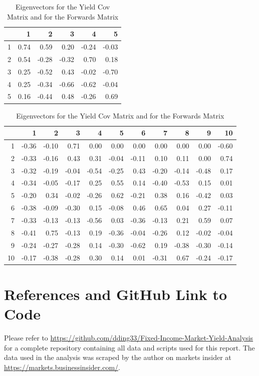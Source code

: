 \documentclass{article}
\begin{document}
\begin{enumerate}
\begin{table}[ht]
\centering
\begin{tabular}{rrrrrr}
  \hline
 & 1 & 2 & 3 & 4 & 5 \\ 
  \hline
1 & 0.74 & 0.59 & 0.20 & -0.24 & -0.03 \\ 
  2 & 0.54 & -0.28 & -0.32 & 0.70 & 0.18 \\ 
  3 & 0.25 & -0.52 & 0.43 & -0.02 & -0.70 \\ 
  4 & 0.25 & -0.34 & -0.66 & -0.62 & -0.04 \\ 
  5 & 0.16 & -0.44 & 0.48 & -0.26 & 0.69 \\ 
   \hline
\end{tabular}
\centering
\begin{tabular}{rrrrrrrrrrr}
  \hline
 & 1 & 2 & 3 & 4 & 5 & 6 & 7 & 8 & 9 & 10 \\ 
  \hline
1 & -0.36 & -0.10 & 0.71 & 0.00 & 0.00 & 0.00 & 0.00 & 0.00 & 0.00 & -0.60 \\ 
  2 & -0.33 & -0.16 & 0.43 & 0.31 & -0.04 & -0.11 & 0.10 & 0.11 & 0.00 & 0.74 \\ 
  3 & -0.32 & -0.19 & -0.04 & -0.54 & -0.25 & 0.43 & -0.20 & -0.14 & -0.48 & 0.17 \\ 
  4 & -0.34 & -0.05 & -0.17 & 0.25 & 0.55 & 0.14 & -0.40 & -0.53 & 0.15 & 0.01 \\ 
  5 & -0.20 & 0.34 & -0.02 & -0.26 & 0.62 & -0.21 & 0.38 & 0.16 & -0.42 & 0.03 \\ 
  6 & -0.38 & -0.09 & -0.30 & 0.15 & -0.08 & 0.46 & 0.65 & 0.04 & 0.27 & -0.11 \\ 
  7 & -0.33 & -0.13 & -0.13 & -0.56 & 0.03 & -0.36 & -0.13 & 0.21 & 0.59 & 0.07 \\ 
  8 & -0.41 & 0.75 & -0.13 & 0.19 & -0.36 & -0.04 & -0.26 & 0.12 & -0.02 & -0.04 \\ 
  9 & -0.24 & -0.27 & -0.28 & 0.14 & -0.30 & -0.62 & 0.19 & -0.38 & -0.30 & -0.14 \\ 
  10 & -0.17 & -0.38 & -0.28 & 0.30 & 0.14 & 0.01 & -0.31 & 0.67 & -0.24 & -0.17 \\ 
   \hline
\end{tabular}
\caption{Eigenvectors for the Yield Cov Matrix and for the Forwards Matrix}
\label{Eigens}
\end{table}

\end{enumerate}

\section*{References and GitHub Link to Code}
    Please refer to \url{https://github.com/dding33/Fixed-Income-Market-Yield-Analysis} for a complete repository containing all data and scripts used for this report. 
    The data used in the analysis was scraped by the author on markets insider at \url{https://markets.businessinsider.com/}.
\end{document}
